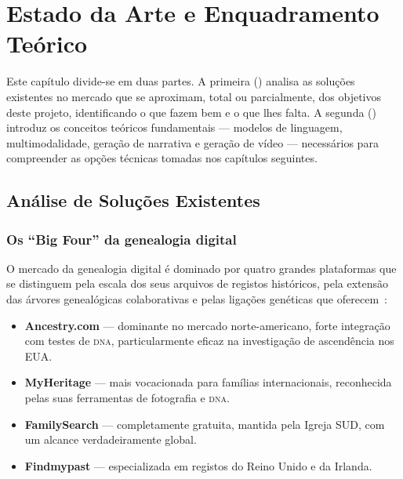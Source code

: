 \chapter{Estado da Arte e Enquadramento Teórico}
\label{cap:estado_arte}

Este capítulo divide-se em duas partes. A primeira ()
analisa as soluções existentes no mercado que se aproximam, total ou
parcialmente, dos objetivos deste projeto, identificando o que fazem bem
e o que lhes falta. A segunda () introduz os
conceitos teóricos fundamentais — modelos de linguagem, multimodalidade,
geração de narrativa e geração de vídeo — necessários para compreender as
opções técnicas tomadas nos capítulos seguintes.

\section{Análise de Soluções Existentes}
\label{sec:solucoes}

\subsection{Os ``Big Four'' da genealogia digital}
\label{sub:bigfour}

O mercado da genealogia digital é dominado por quatro grandes plataformas
que se distinguem pela escala dos seus arquivos de registos históricos,
pela extensão das árvores genealógicas colaborativas e pelas ligações
genéticas que oferecem~\cite{familytreemag}:

\begin{itemize}[leftmargin=*]
  \item \textbf{Ancestry.com} — dominante no mercado norte-americano,
  forte integração com testes de \textsc{dna}, particularmente eficaz na
  investigação de ascendência nos EUA.
  \item \textbf{MyHeritage} — mais vocacionada para famílias
  internacionais, reconhecida pelas suas ferramentas de fotografia e
  \textsc{dna}.
  \item \textbf{FamilySearch} — completamente gratuita, mantida pela
  Igreja SUD, com um alcance verdadeiramente global.
  \item \textbf{Findmypast} — especializada em registos do Reino Unido e
  da Irlanda.
\end{itemize}

